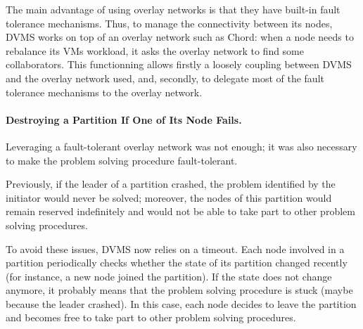 The main advantage of using overlay networks is that they have built-in fault 
tolerance mechanisms. Thus, to manage the connectivity between its nodes, DVMS 
works on top of an overlay network such as Chord: when a node needs to rebalance
its VMs workload, it asks the overlay network to find some collaborators. This 
functionning allows firstly a loosely coupling between DVMS and the overlay 
network used, and, secondly, to delegate most of the fault tolerance mechanisms 
to the overlay network.


\paragraph{Destroying a Partition If One of Its Node Fails.}

Leveraging a fault-tolerant overlay network was not enough; it was also necessary to make the
problem solving procedure fault-tolerant.

Previously, if the leader of a partition crashed, the problem identified by the
initiator would never be solved; moreover, the nodes of this partition would
remain reserved indefinitely and would not be able to take part to other problem
solving procedures.

To avoid these issues, DVMS now relies on a timeout.  Each node involved in a
partition periodically checks whether the state of its partition changed
recently (for instance, a new node joined the partition).
%
If the state does not change anymore, it probably means that the problem solving
procedure is stuck (maybe because the leader crashed).
%
In this case, each node decides to leave the partition and becomes free to take
part to other problem solving procedures.
